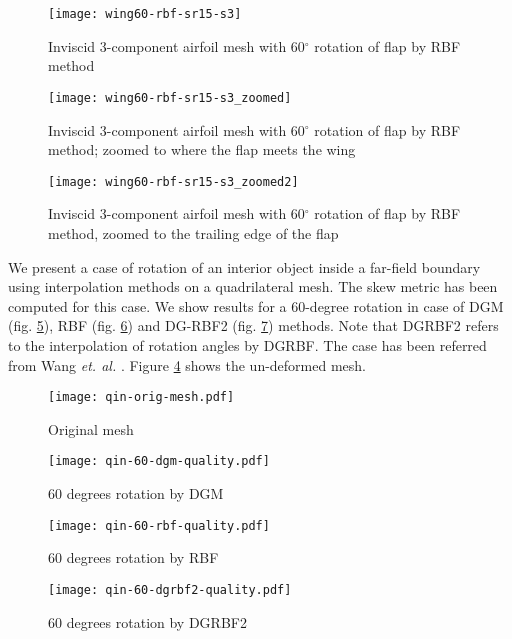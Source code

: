 \begin{figure}
	\centering
	\texttt{[image: wing60-rbf-sr15-s3]}
	\caption{Inviscid 3-component airfoil mesh with 60$^\circ$ rotation of flap by RBF method}
	\label{fig:wing-inviscid-rbf}
\end{figure}
\begin{figure}
	\centering
	\texttt{[image: wing60-rbf-sr15-s3\_zoomed]}
	\caption{Inviscid 3-component airfoil mesh with 60$^\circ$ rotation of flap by RBF method; zoomed to where the flap meets the wing}
	\label{fig:wing-inviscid-rbf-zoomed}
\end{figure}
\begin{figure}
	\centering
	\texttt{[image: wing60-rbf-sr15-s3\_zoomed2]}
	\caption{Inviscid 3-component airfoil mesh with 60$^\circ$ rotation of flap by RBF method, zoomed to the trailing edge of the flap}
	\label{fig:wing-inviscid-rbf-zoomed2}
\end{figure}
 
\FloatBarrier

 We present a case of rotation of an interior object inside a far-field boundary using interpolation methods on a quadrilateral mesh. The skew metric has been computed for this case. We show results for a 60-degree rotation in case of DGM (fig. \ref{fig:qin-60-dgm}), RBF (fig. \ref{fig:qin-60-rbf}) and DG-RBF2 (fig. \ref{fig:qin-60-dgrbf2}) methods. Note that DGRBF2 refers to the interpolation of rotation angles by DGRBF. The case has been referred from Wang \emph{et. al.} \cite{mm:dgrbf}. Figure \ref{fig:qin-orig} shows the un-deformed mesh.
 
 \begin{figure}
 	\centering
 	\texttt{[image: qin-orig-mesh.pdf]}
 	\caption{Original mesh}
 	\label{fig:qin-orig}
 \end{figure}
 
 \begin{figure}
 	\centering
 	\texttt{[image: qin-60-dgm-quality.pdf]}
 	\caption{60 degrees rotation by DGM}
 	\label{fig:qin-60-dgm}
 \end{figure}
 
 \begin{figure}
 	\centering
 	\texttt{[image: qin-60-rbf-quality.pdf]}
 	\caption{60 degrees rotation by RBF}
 	\label{fig:qin-60-rbf}
 \end{figure}
 
 \begin{figure}
 	\centering
 	\texttt{[image: qin-60-dgrbf2-quality.pdf]}
 	\caption{60 degrees rotation by DGRBF2}
 	\label{fig:qin-60-dgrbf2}
 \end{figure}
 
